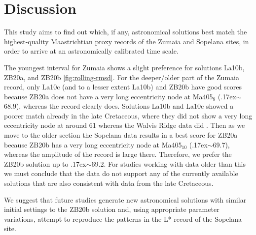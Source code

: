 \documentclass[draft]{agujournal2019}
\newcommand{\appr}{\raise.17ex\hbox{$\scriptstyle\sim$}} %
\newcommand{\ijk}{\textcolor{blue}}
\begin{document}
\section{Discussion}\label{sec:discussion}

This study aims to find out which, if any, astronomical solutions best match the highest-quality Maastrichtian proxy records of the Zumaia and Sopelana sites, in order to arrive at an astronomically calibrated time scale.

The youngest interval for Zumaia shows a slight preference for solutions La10b, ZB20a, and ZB20b \cref{fig:rolling-rmsd}.
For the deeper/older part of the Zumaia record, only La10c (and to a lesser extent La10b) and ZB20b have good scores because ZB20a does not have a very long eccentricity node at Ma405\(_{8}\) (\appr\qty{68.9}{\millionyearago}), whereas the record clearly does.
Solutions La10b and La10c showed a poorer match already in the late Cretaceous, where they did not show a very long eccentricity node at around \qty{61}{\millionyearago} whereas the Walvis Ridge data did \cite{ZeebeLourens2022EPSL}.
Then as we move to the older section the Sopelana data results in a best score for ZB20a because ZB20b has a very long eccentricity node at Ma405\(_{10}\) (\appr\qty{69.7}{\millionyearago}), whereas the amplitude of the record is large there.
Therefore, we prefer the ZB20b solution up to \appr\qty{69.2}{\millionyearago}.
For studies working with data older than this we must conclude that the data do not support any of the currently available solutions that are also consistent with data from the late Cretaceous.

We suggest that future studies generate new astronomical solutions with similar initial settings to the ZB20b solution and, using appropriate parameter variations, attempt to reproduce the patterns in the \gls{L*} record of the Sopelana site.




\end{document}
